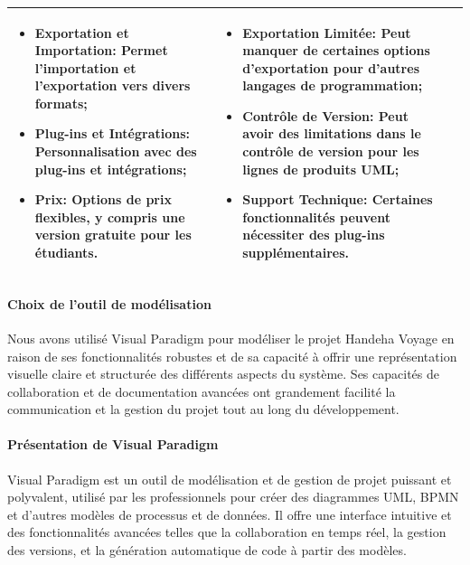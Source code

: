 \documentclass[12pt]{report}
\begin{document}
\begin{longtable}{|p{3cm}|p{5.5cm}|p{5.5cm}|}
\begin{itemize}
							\item \textbf{Exportation et Importation:} Permet l'importation et l'exportation vers divers formats;
							\item \textbf{Plug-ins et Intégrations:} Personnalisation avec des plug-ins et intégrations;
							\item \textbf{Prix:} Options de prix flexibles, y compris une version gratuite pour les étudiants.
						\end{itemize} &
						\begin{itemize}
							\item \textbf{Exportation Limitée:} Peut manquer de certaines options d'exportation pour d'autres langages de programmation;
							\item \textbf{Contrôle de Version:} Peut avoir des limitations dans le contrôle de version pour les lignes de produits UML;
							\item \textbf{Support Technique:} Certaines fonctionnalités peuvent nécessiter des plug-ins supplémentaires.
						\end{itemize}\\						
						\hline
				    \end{longtable}


				\paragraph{Choix de l'outil de modélisation}
				
				Nous avons utilisé Visual Paradigm pour modéliser le projet Handeha Voyage en raison de ses fonctionnalités robustes et de sa capacité à offrir une représentation visuelle claire et structurée des différents aspects du système. Ses capacités de collaboration et de documentation avancées ont grandement facilité la communication et la gestion du projet tout au long du développement.


				\paragraph{Présentation de Visual Paradigm}

				Visual Paradigm est un outil de modélisation et de gestion de projet puissant et polyvalent, utilisé par les professionnels pour créer des diagrammes UML, BPMN et d'autres modèles de processus et de données. Il offre une interface intuitive et des fonctionnalités avancées telles que la collaboration en temps réel, la gestion des versions, et la génération automatique de code à partir des modèles.\\
\end{document}
